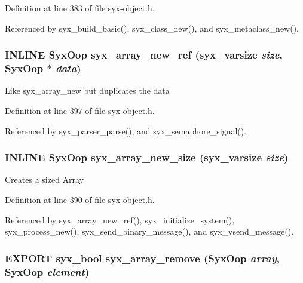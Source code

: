 Definition at line 383 of file syx-object.h.

Referenced by syx\_\-build\_\-basic(), syx\_\-class\_\-new(), and syx\_\-metaclass\_\-new().\hypertarget{syx-object_8h_5c63c40451ce204441acff87eea226bc}{
\subsubsection{\setlength{\rightskip}{0pt plus 5cm}INLINE {\bf SyxOop} syx\_\-array\_\-new\_\-ref ({\bf syx\_\-varsize} {\em size}, \/  {\bf SyxOop} $\ast$ {\em data})}}
\label{syx-object_8h_5c63c40451ce204441acff87eea226bc}


Like syx\_\-array\_\-new but duplicates the data 

Definition at line 397 of file syx-object.h.

Referenced by syx\_\-parser\_\-parse(), and syx\_\-semaphore\_\-signal().\hypertarget{syx-object_8h_bae072a6a2e20392d22f98e09fdc42c0}{
\subsubsection{\setlength{\rightskip}{0pt plus 5cm}INLINE {\bf SyxOop} syx\_\-array\_\-new\_\-size ({\bf syx\_\-varsize} {\em size})}}
\label{syx-object_8h_bae072a6a2e20392d22f98e09fdc42c0}


Creates a sized Array 

Definition at line 390 of file syx-object.h.

Referenced by syx\_\-array\_\-new\_\-ref(), syx\_\-initialize\_\-system(), syx\_\-process\_\-new(), syx\_\-send\_\-binary\_\-message(), and syx\_\-vsend\_\-message().\hypertarget{syx-object_8h_84e829e1cfb191f82e954d90787f1722}{
\subsubsection{\setlength{\rightskip}{0pt plus 5cm}EXPORT {\bf syx\_\-bool} syx\_\-array\_\-remove ({\bf SyxOop} {\em array}, \/  {\bf SyxOop} {\em element})}}
\label{syx-object_8h_84e829e1cfb191f82e954d90787f1722}


